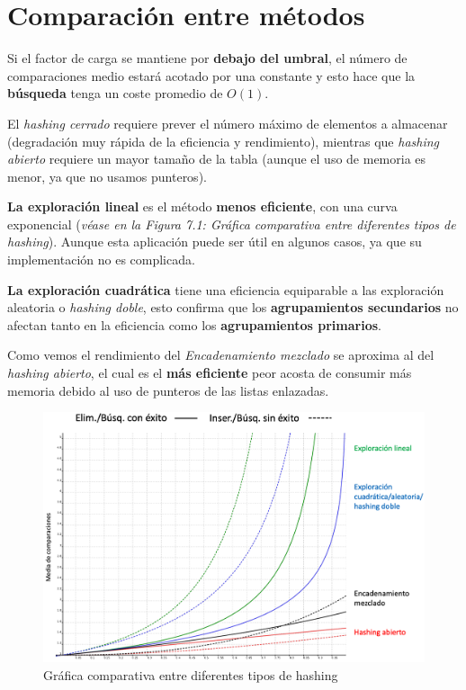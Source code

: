 \section{Comparación entre métodos}
Si el factor de carga se mantiene por \textbf{debajo del umbral}, el número de comparaciones medio estará acotado por una constante y esto hace que la \textbf{búsqueda} tenga un coste promedio de \(O(1)\).

El \textit{hashing cerrado} requiere prever el número máximo de elementos a almacenar (degradación muy rápida de la eficiencia y rendimiento), mientras que \textit{hashing abierto} requiere un mayor tamaño de la tabla (aunque el uso de memoria es menor, ya que no usamos punteros).

\textbf{La exploración lineal} es el método \textbf{menos eficiente}, con una curva exponencial (\textit{véase en la Figura 7.1: Gráfica comparativa entre diferentes tipos de hashing}). Aunque esta aplicación puede ser útil en algunos casos, ya que su implementación no es complicada.

\textbf{La exploración cuadrática} tiene una eficiencia equiparable a las exploración aleatoria o \textit{hashing doble}, esto confirma que los \textbf{agrupamientos secundarios} no afectan tanto en la eficiencia como los \textbf{agrupamientos primarios}.

Como vemos el rendimiento del \textit{Encadenamiento mezclado} se aproxima al del \textit{hashing abierto}, el cual es el \textbf{más eficiente} peor acosta de consumir más memoria debido al uso de punteros de las listas enlazadas.

\begin{figure}[h]
  \begin{center}
    \includegraphics[width=.9\textwidth]{assets/hash1.png}
  \end{center}
  \caption{Gráfica comparativa entre diferentes tipos de hashing}
\end{figure}

